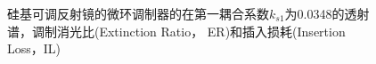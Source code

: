 \begin{figure}[htb]
{\begin{minipage}[]{0.5\textwidth}
		\end{minipage}}		
	\caption{硅基可调反射镜的微环调制器的在第一耦合系数$k_{s1}$为0.0348的透射谱，调制消光比(Extinction Ratio， ER)和插入损耗(Insertion Loss，IL)}
	\label{chapt5_reflactor_modulator_k1_modulator}	
\end{figure}

